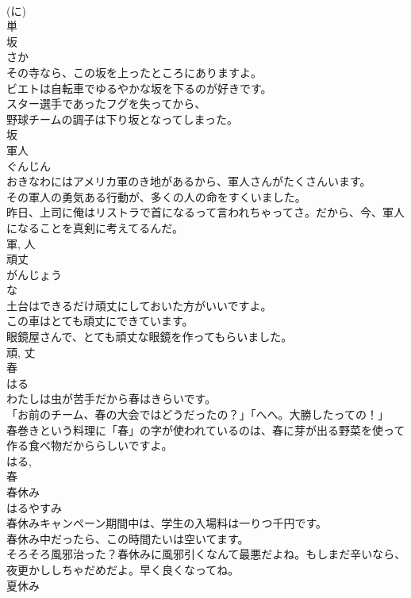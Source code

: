 \documentclass[8pt]{extreport}
\begin{document}
\begin{CJK}{UTF8}{min}
\\	(に) 
\\	単	
\\	坂	
\\	さか	
\\	その寺なら、この坂を上ったところにありますよ。	
\\	ビエトは自転車でゆるやかな坂を下るのが好きです。	
\\	スター選手であったフグを失ってから、
\\	野球チームの調子は下り坂となってしまった。	
\\	坂	
\\	軍人	
\\	ぐんじん	
\\	おきなわにはアメリカ軍のき地があるから、軍人さんがたくさんいます。	
\\	その軍人の勇気ある行動が、多くの人の命をすくいました。	
\\	昨日、上司に俺はリストラで首になるって言われちゃってさ。だから、今、軍人になることを真剣に考えてるんだ。	
\\	軍, 人	
\\	頑丈	
\\	がんじょう	
\\	な 
\\	土台はできるだけ頑丈にしておいた方がいいですよ。	
\\	この車はとても頑丈にできています。	
\\	眼鏡屋さんで、とても頑丈な眼鏡を作ってもらいました。	
\\	頑, 丈	
\\	春	
\\	はる	
\\	わたしは虫が苦手だから春はきらいです。	
\\	「お前のチーム、春の大会ではどうだったの？」「へへ。大勝したっての！」	
\\	春巻きという料理に「春」の字が使われているのは、春に芽が出る野菜を使って作る食べ物だかららしいですよ。	
\\	はる, 
\\	春	
\\	春休み	
\\	はるやすみ	
\\	春休みキャンペーン期間中は、学生の入場料は一りつ千円です。	
\\	春休み中だったら、この時間たいは空いてます。	
\\	そろそろ風邪治った？春休みに風邪引くなんて最悪だよね。もしまだ辛いなら、夜更かししちゃだめだよ。早く良くなってね。	
\\	夏休み 

\end{CJK}
\end{document}
